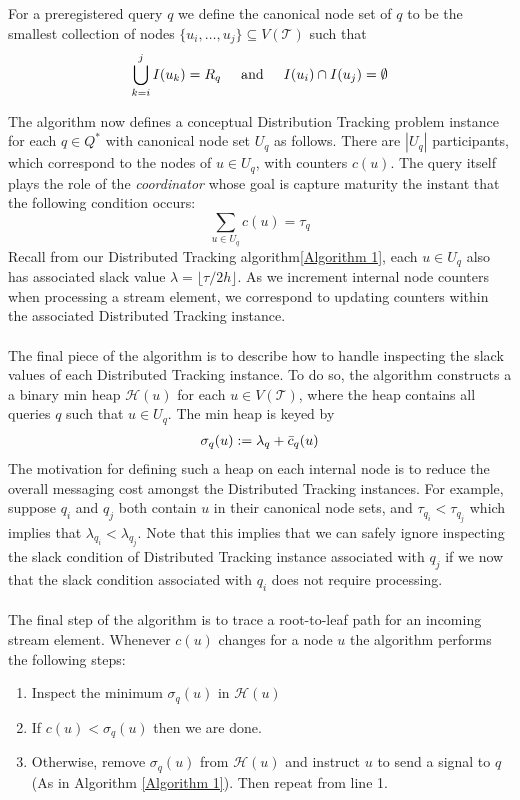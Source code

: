 \begin{definition}
    For a preregistered query $q$ we define the canonical node set of $q$ to be the smallest collection of nodes $\{u_i, \dots, u_j\}\subseteq V(\mathcal{T})$ such that 
    $$\bigcup_{k=i}^{j}I(u_k) = R_q \hspace{5mm} \text{and} \hspace{5mm} I(u_i)\cap I(u_j) = \emptyset$$
\end{definition}
The algorithm now defines a conceptual Distribution Tracking problem instance for each $q\in Q^*$ with canonical node set $U_q$ as follows. There are $|U_q|$ participants, which correspond to the nodes of $u\in U_q$, with counters $c(u)$. The query itself plays the role of the \textit{coordinator} whose goal is capture maturity the instant that the following condition occurs: 
$$\sum_{u \in U_q}c(u) = \tau_q$$
Recall from our Distributed Tracking algorithm\ref{Algorithm 1}, each $u\in U_q$ also has associated slack value $\lambda = \lfloor \tau/2h \rfloor$. As we increment internal node counters when processing a stream element, we correspond to updating counters within the associated Distributed Tracking instance. \\
\\
The final piece of the algorithm is to describe how to handle inspecting the slack values of each Distributed Tracking instance. 
To do so, the algorithm constructs a a binary min heap $\mathcal{H}(u)$ for each $u\in V(\mathcal{T})$, where the heap contains all queries $q$ such that $u\in U_q$. The min heap is keyed by 
\begin{align}
    \sigma_q(u) := \lambda_q + \Bar{c}_q(u)
\end{align}
The motivation for defining such a heap on each internal node is to reduce the overall messaging cost amongst the Distributed Tracking instances. For example, suppose $q_i$ and $q_j$ both contain $u$ in their canonical node sets, and $\tau_{q_i} < \tau_{q_j}$ which implies that $\lambda_{q_i} < \lambda_{q_j}$. Note that this implies that we can safely ignore inspecting the slack condition of Distributed Tracking instance associated with $q_j$ if we now that the slack condition associated with $q_i$ does not require processing. \\
\\
The final step of the algorithm is to trace a root-to-leaf path for an incoming stream element. Whenever $c(u)$ changes for a node $u$ the algorithm performs the following steps: \begin{enumerate}
    \item Inspect the minimum $\sigma_q(u)$ in $\mathcal{H}(u)$
    \item If $c(u) < \sigma_q(u)$ then we are done.
    \item Otherwise, remove $\sigma_q(u)$ from $\mathcal{H}(u)$ and instruct $u$ to send a signal to $q$ (As in Algorithm \ref{Algorithm 1}). Then repeat from line 1. 
\end{enumerate}
